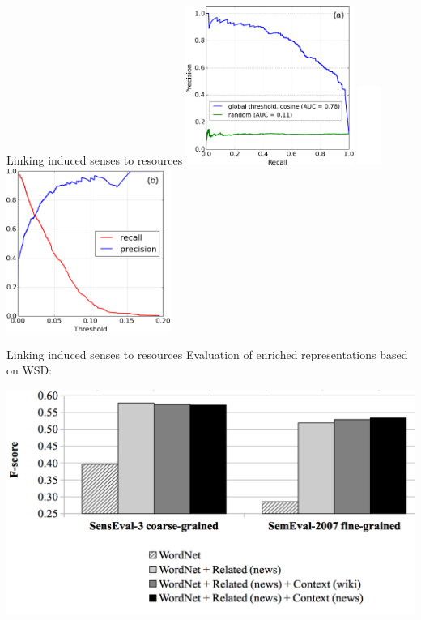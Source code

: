 \begin{frame}{ Linking induced senses to resources }
		\vspace{2em}
		\centering
\includegraphics[width=0.41\textwidth]{precision-recall}
\includegraphics[width=0.06\textwidth]{filler}
\includegraphics[width=0.40\textwidth]{pr-function-of-threshold}

\end{frame}

\begin{frame}{ Linking induced senses to resources }
\centering
Evaluation of enriched representations based on WSD:

\includegraphics[width=1.0\textwidth]{topic-hist-4}

\end{frame}


